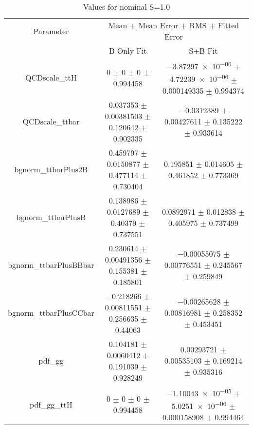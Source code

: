 \begin{table}
\centering
\caption{Values for nominal S=1.0}
\begin{tabular}{ccc}
\toprule
Parameter & \multicolumn{2}{c}{Mean $\pm$ Mean Error $\pm$ RMS $\pm$ Fitted Error}\\
 & B-Only Fit & S+B Fit\\
\midrule
QCDscale\_ttH & \num{0} $\pm$ \num{0} $\pm$ \num{0} $\pm$ \num{0.994458} & \num{-3.87297e-06} $\pm$ \num{4.72239e-06} $\pm$ \num{0.000149335} $\pm$ \num{0.994374}\\
QCDscale\_ttbar & \num{0.037353} $\pm$ \num{0.00381503} $\pm$ \num{0.120642} $\pm$ \num{0.902335} & \num{-0.0312389} $\pm$ \num{0.00427611} $\pm$ \num{0.135222} $\pm$ \num{0.933614}\\
bgnorm\_ttbarPlus2B & \num{0.459797} $\pm$ \num{0.0150877} $\pm$ \num{0.477114} $\pm$ \num{0.730404} & \num{0.195851} $\pm$ \num{0.014605} $\pm$ \num{0.461852} $\pm$ \num{0.773369}\\
bgnorm\_ttbarPlusB & \num{0.138986} $\pm$ \num{0.0127689} $\pm$ \num{0.40379} $\pm$ \num{0.737551} & \num{0.0892971} $\pm$ \num{0.012838} $\pm$ \num{0.405975} $\pm$ \num{0.737499}\\
bgnorm\_ttbarPlusBBbar & \num{0.230614} $\pm$ \num{0.00491356} $\pm$ \num{0.155381} $\pm$ \num{0.185801} & \num{-0.00055075} $\pm$ \num{0.00776551} $\pm$ \num{0.245567} $\pm$ \num{0.259849}\\
bgnorm\_ttbarPlusCCbar & \num{-0.218266} $\pm$ \num{0.00811551} $\pm$ \num{0.256635} $\pm$ \num{0.44063} & \num{-0.00265628} $\pm$ \num{0.00816981} $\pm$ \num{0.258352} $\pm$ \num{0.453451}\\
pdf\_gg & \num{0.104181} $\pm$ \num{0.0060412} $\pm$ \num{0.191039} $\pm$ \num{0.928249} & \num{0.00293721} $\pm$ \num{0.00535103} $\pm$ \num{0.169214} $\pm$ \num{0.935316}\\
pdf\_gg\_ttH & \num{0} $\pm$ \num{0} $\pm$ \num{0} $\pm$ \num{0.994458} & \num{-1.10043e-05} $\pm$ \num{5.0251e-06} $\pm$ \num{0.000158908} $\pm$ \num{0.994464}\\
\bottomrule
\end{tabular}
\end{table}